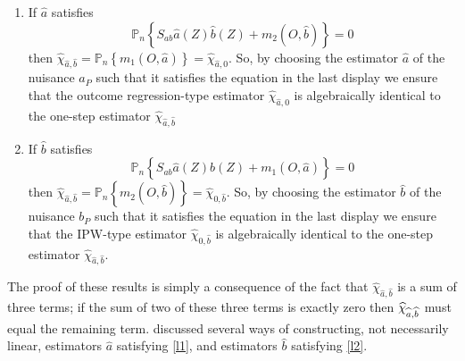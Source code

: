 \documentclass{article}
\begin{document}
\begin{enumerate}
\item If $\widehat{a}$ satisfies 
\begin{equation}
\mathbb{P}_{n}\left\{ S_{ab}\widehat{a}(Z)\widehat{b}(Z)+m_{2}(O,\widehat{b}%
)\right\} =0  \label{l1}
\end{equation}%
then $\widehat{\chi }_{\widehat{a},\widehat{b}}=\mathbb{P}_{n}\left\{
m_{1}(O,\widehat{a})\right\} =\widehat{\chi }_{\widehat{a},0}.$ So, by
choosing the estimator $\widehat{a}$ of the nuisance $a_{P}$ such that it
satisfies the equation in the last display we ensure that the outcome
regression-type estimator $\widehat{\chi }_{\widehat{a},0}$ is algebraically
identical to the one-step estimator $\widehat{\chi }_{\widehat{a},\widehat{b}%
}$

\item If $\widehat{b}$ satisfies 
\begin{equation}
\mathbb{P}_{n}\left\{ S_{ab}\widehat{a}(Z)\widehat{b}(Z)+m_{1}(O,\widehat{a}%
)\right\} =0  \label{l2}
\end{equation}%
then $\widehat{\chi }_{\widehat{a},\widehat{b}}=\mathbb{P}_{n}\left\{
m_{2}(O,\widehat{b})\right\} =\widehat{\chi }_{0,\widehat{b}}.$ So, by
choosing the estimator $\widehat{b}$ of the nuisance $b_{P}$ such that it
satisfies the equation in the last display we ensure that the IPW-type
estimator $\widehat{\chi }_{0,\widehat{b}}$ is algebraically identical to
the one-step estimator $\widehat{\chi }_{\widehat{a},\widehat{b}}.$
\end{enumerate}

The proof of these results is simply a consequence of the fact that $%
\widehat{\chi }_{\widehat{a},\widehat{b}}$ is a sum of three terms; if the
sum of two of these three terms is exactly zero then $\widehat{\chi }_{%
\widehat{a},\widehat{b}}$ must equal the remaining term. \cite{robins2007comment}
discussed several ways of constructing, not necessarily linear, estimators $%
\widehat{a}$ satisfying \eqref{l1}, and estimators $\widehat{b}$ satisfying %
\eqref{l2}.  
\end{document}
